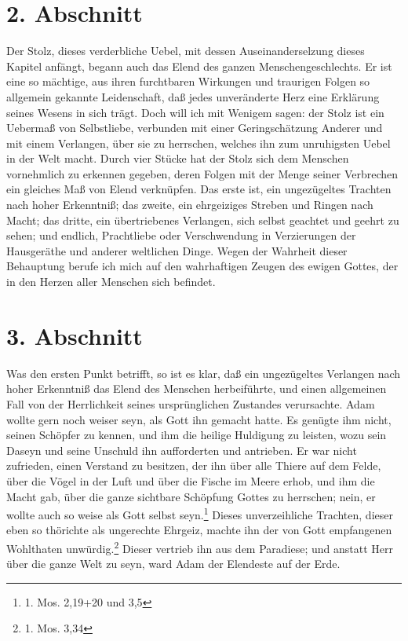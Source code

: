 \section{2. Abschnitt}

Der Stolz, dieses verderbliche Uebel, mit dessen Auseinanderselzung dieses Kapitel anfängt, begann auch das Elend des ganzen Menschengeschlechts. Er ist eine so mächtige, aus ihren furchtbaren Wirkungen und traurigen Folgen so allgemein gekannte Leidenschaft, daß jedes unveränderte Herz eine Erklärung seines Wesens in sich trägt. Doch will ich mit Wenigem sagen: der Stolz ist ein Uebermaß von Selbstliebe, verbunden mit einer Geringschätzung Anderer und mit einem Verlangen, über sie zu herrschen, welches ihn zum unruhigsten Uebel in der Welt macht. Durch vier Stücke hat der Stolz sich dem Menschen vornehmlich zu erkennen gegeben, deren Folgen mit der Menge seiner Verbrechen ein gleiches Maß von Elend verknüpfen. Das erste ist, ein ungezügeltes Trachten nach hoher Erkenntniß; das zweite, ein ehrgeiziges Streben und Ringen nach Macht; das dritte, ein übertriebenes Verlangen, sich selbst geachtet und geehrt zu sehen; und endlich, Prachtliebe oder Verschwendung in Verzierungen der Hausgeräthe und anderer weltlichen Dinge. Wegen der Wahrheit dieser Behauptung berufe ich mich auf den wahrhaftigen Zeugen des ewigen Gottes, der in den Herzen aller Menschen sich befindet.

\section{3. Abschnitt}

Was den ersten Punkt betrifft, so ist es klar, daß ein ungezügeltes Verlangen nach hoher Erkenntniß das Elend des Menschen herbeiführte, und einen allgemeinen Fall von der Herrlichkeit seines ursprünglichen Zustandes verursachte. Adam wollte gern noch weiser seyn, als Gott ihn gemacht hatte. Es genügte ihm nicht, seinen Schöpfer zu kennen, und ihm die heilige Huldigung zu leisten, wozu sein Daseyn und seine Unschuld ihn aufforderten und antrieben. Er war nicht zufrieden, einen Verstand zu besitzen, der ihn über alle Thiere auf dem Felde, über die Vögel in der Luft und über die Fische im Meere erhob, und ihm die Macht gab, über die ganze sichtbare Schöpfung Gottes zu herrschen; nein, er wollte auch so weise als Gott selbst seyn.\footnote{1. Mos. 2,19+20 und 3,5} Dieses unverzeihliche Trachten, dieser eben so thörichte als ungerechte Ehrgeiz, machte ihn der von Gott empfangenen Wohlthaten unwürdig.\footnote{1. Mos. 3,34} Dieser vertrieb ihn aus dem Paradiese; und anstatt Herr über die ganze Welt zu seyn, ward Adam der Elendeste auf der Erde.

